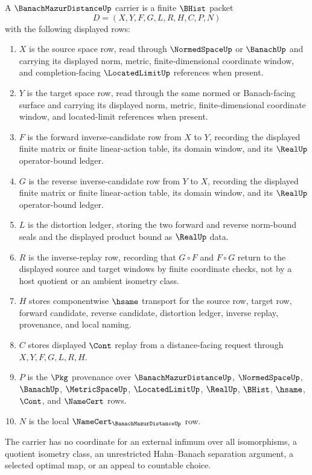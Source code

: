 \begin{definition}
\label{def:banach-mazur-distance-carrier}
A $\BanachMazurDistanceUp$ carrier is a finite $\BHist$ packet
$$
D=(X,Y,F,G,L,R,H,C,P,N)
$$
with the following displayed rows:
\begin{enumerate}
\item $X$ is the source space row, read through $\NormedSpaceUp$ or $\BanachUp$ and carrying its displayed norm, metric, finite-dimensional coordinate window, and completion-facing $\LocatedLimitUp$ references when present.
\item $Y$ is the target space row, read through the same normed or Banach-facing surface and carrying its displayed norm, metric, finite-dimensional coordinate window, and located-limit references when present.
\item $F$ is the forward inverse-candidate row from $X$ to $Y$, recording the displayed finite matrix or finite linear-action table, its domain window, and its $\RealUp$ operator-bound ledger.
\item $G$ is the reverse inverse-candidate row from $Y$ to $X$, recording the displayed finite matrix or finite linear-action table, its domain window, and its $\RealUp$ operator-bound ledger.
\item $L$ is the distortion ledger, storing the two forward and reverse norm-bound seals and the displayed product bound as $\RealUp$ data.
\item $R$ is the inverse-replay row, recording that $G \circ F$ and $F \circ G$ return to the displayed source and target windows by finite coordinate checks, not by a host quotient or an ambient isometry class.
\item $H$ stores componentwise $\hsame$ transport for the source row, target row, forward candidate, reverse candidate, distortion ledger, inverse replay, provenance, and local naming.
\item $C$ stores displayed $\Cont$ replay from a distance-facing request through $X,Y,F,G,L,R,H$.
\item $P$ is the $\Pkg$ provenance over $\BanachMazurDistanceUp$, $\NormedSpaceUp$, $\BanachUp$, $\MetricSpaceUp$, $\LocatedLimitUp$, $\RealUp$, $\BHist$, $\hsame$, $\Cont$, and $\NameCert$ rows.
\item $N$ is the local $\NameCert_{\BanachMazurDistanceUp}$ row.
\end{enumerate}
The carrier has no coordinate for an external infimum over all isomorphisms, a quotient isometry class, an unrestricted Hahn--Banach separation argument, a selected optimal map, or an appeal to countable choice.
\end{definition}

